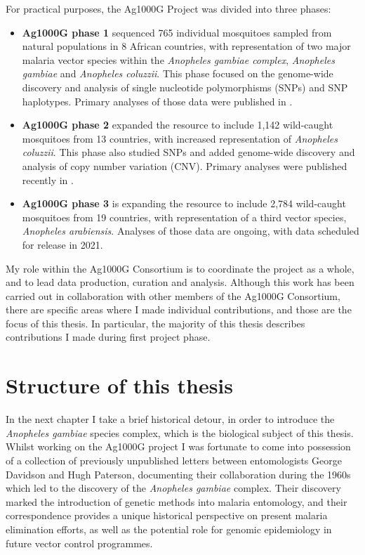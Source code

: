 \begin{refsection}
For practical purposes, the Ag1000G Project was divided into three phases:
%
\begin{itemize}
%
\item \textbf{Ag1000G phase 1} sequenced 765 individual mosquitoes sampled from natural populations in 8 African countries, with representation of two major malaria vector species within the \textit{Anopheles gambiae complex}, \textit{Anopheles gambiae} and \textit{Anopheles coluzzii}.
%
This phase focused on the genome-wide discovery and analysis of single nucleotide polymorphisms (SNPs) and SNP haplotypes.
%
Primary analyses of those data were published in \textcite{Ag1000G2017}.
%
\item \textbf{Ag1000G phase 2} expanded the resource to include 1,142 wild-caught mosquitoes from 13 countries, with increased representation of \textit{Anopheles coluzzii}.
%
This phase also studied SNPs and added genome-wide discovery and analysis of copy number variation (CNV).
%
Primary analyses were published recently in \textcite{Ag1000G2020}.
%
\item \textbf{Ag1000G phase 3} is expanding the resource to include 2,784 wild-caught mosquitoes from 19 countries, with representation of a third vector species, \textit{Anopheles arabiensis}.
%
Analyses of those data are ongoing, with data scheduled for release in 2021.
%
\end{itemize}



My role within the Ag1000G Consortium is to coordinate the project as a whole, and to lead data production, curation and analysis.
%
Although this work has been carried out in collaboration with other members of the Ag1000G Consortium, there are specific areas where I made individual contributions, and those are the focus of this thesis.
%
In particular, the majority of this thesis describes contributions I made during first project phase.


\section{Structure of this thesis}\label{sec:structure}


In the next chapter I take a brief historical detour, in order to introduce the \textit{Anopheles gambiae} species complex, which is the biological subject of this thesis.
%
Whilst working on the Ag1000G project I was fortunate to come into possession of a collection of previously unpublished letters between entomologists George Davidson and Hugh Paterson, documenting their collaboration during the 1960s which led to the discovery of the \textit{Anopheles gambiae} complex.
%
Their discovery marked the introduction of genetic methods into malaria entomology, and their correspondence provides a unique historical perspective on present malaria elimination efforts, as well as the potential role for genomic epidemiology in future vector control programmes.


\end{refsection}
